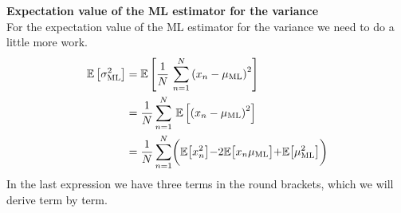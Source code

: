 \documentclass[11pt, DINA4, fleqn]{amsart}
\begin{document}
\noindent
\textbf{Expectation value of the ML estimator for the variance}\\
For the expectation value of the ML estimator for the variance we need to do a little more work.
\begin{align}
\mathbb{E}\left[\sigma^2_{\text{ML}}\right] &= 
\mathbb{E}\left[\dfrac{1}{N} \, \sum\displaylimits_{n=1}^{N} \left( x_n - \mu_{\text{ML}}\right)^2\right] \\
&= \dfrac{1}{N} \sum \displaylimits_{n=1}^{N} \, \mathbb{E}\left[ \left(x_n - \mu_{\text{ML}}\right)^2\right] \\
&= \dfrac{1}{N} \sum \displaylimits_{n=1}^{N}
\biggl(
\mathbb{E}\bigl[x_n^2\bigl] - 2 \mathbb{E}\bigl[x_n\mu_{\text{ML}}\bigl]
+ \mathbb{E}\bigl[\mu_{\text{ML}}^2\bigl]
\biggl)
\label{eq:3summands}
\end{align}
In the last expression we have three terms in the round brackets, which we will derive term by term.
\end{document}
